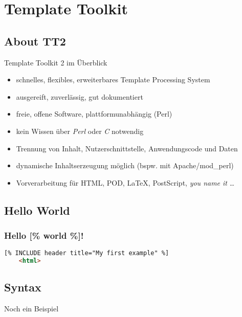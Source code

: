 \documentclass[hyperref={pdfpagelabels=false}]{beamer}
\begin{document}
\section{Template Toolkit}

\subsection{About TT2}

\begin{frame}{Template Toolkit 2 im Überblick}
    \begin{itemize}
        \item schnelles, flexibles, erweiterbares Template Processing
            System
        \item ausgereift, zuverlässig, gut dokumentiert
        \pause
        \item freie, offene Software, plattformunabhängig (Perl)
        \item kein Wissen über \emph{Perl} oder \emph{C} notwendig
        \pause
        \item Trennung von Inhalt, Nutzerschnittstelle, Anwendungscode
            und Daten
        \item dynamische Inhaltserzeugung möglich (bspw. mit
            Apache/mod\_perl)
        \pause
        \item Vorverarbeitung für HTML, POD, \LaTeX, PostScript,
            \emph{you name it} \dots
    \end{itemize}
\end{frame}

\subsection{Hello World}

\begin{frame}[fragile]
    \frametitle{Hello [\% world \%]!}
    \begin{lstlisting}[language=HTML]
    [% INCLUDE header title="My first example" %]
    <html>
    \end{lstlisting} 
\end{frame}

\subsection{Syntax}

\begin{frame}{Noch ein Beispiel}
\end{frame}
\end{document}
